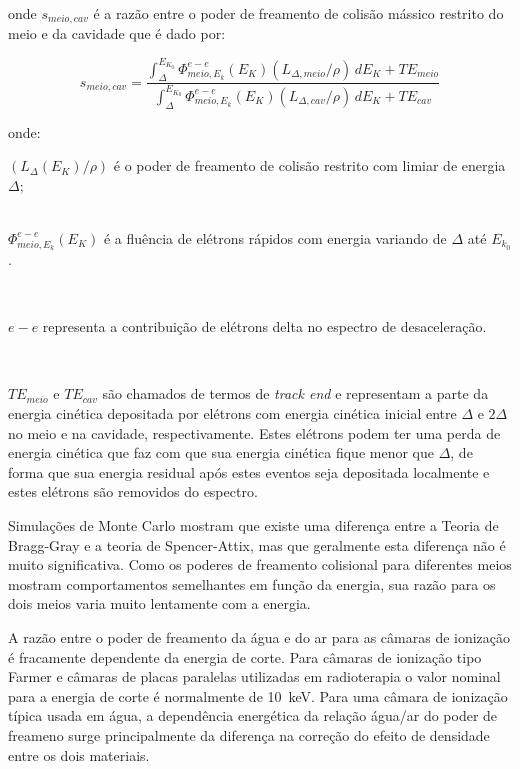 \documentclass[11pt,a4paper]{article}
\newcounter{exemplo}
\begin{document}
			\noindent onde $s_{meio,cav}$ é a razão entre o poder de freamento de colisão mássico restrito do meio e da cavidade que é dado por:

			
			\begin{equation}
				s_{meio,cav}
				= \frac{\int_{\Delta}^{E_{K_0}} \Phi_{meio, E_k}^{e-e}(E_K)(L_{\Delta , meio}/\rho)\,dE_K + TE_{meio}}
				{\int_{\Delta}^{E_{K_0}} \Phi_{meio, E_k}^{e-e}(E_K)(L_{\Delta , cav}/\rho)\,dE_K + TE_{cav}}
			\end{equation}

			\noindent onde:

			\begin{exemplo}
				
			
			\begin{flushleft}
				$(L_{\Delta}(E_K)/\rho)$ é o poder de freamento de colisão restrito com limiar de energia $\Delta$; \\

				\

				$\Phi_{meio, E_k}^{e-e}(E_K)$ é a fluência de elétrons rápidos com energia variando de $\Delta$ até $E_{k_0}$.

				\

				$e-e$ representa a contribuição de elétrons delta no espectro de desaceleração.

				\

				$TE_{meio}$ e $TE_{cav}$ são chamados de termos de \textit{track end} e representam a parte da energia cinética depositada por elétrons com energia cinética inicial entre $\Delta$ e $2\Delta$ no meio e na cavidade, respectivamente. Estes elétrons podem ter uma perda de energia cinética que faz com que sua energia cinética fique menor que $\Delta$, de forma que sua energia residual após estes eventos seja depositada localmente e estes elétrons são removidos do espectro. 

			\end{flushleft}
			\end{exemplo}

			Simulações de Monte Carlo mostram que existe uma diferença entre a Teoria de Bragg-Gray e a teoria de Spencer-Attix, mas que geralmente esta diferença não é muito significativa. Como os poderes de freamento colisional para diferentes meios mostram comportamentos semelhantes em função da energia, sua razão para os dois meios varia muito lentamente com a energia. 

			A razão entre o poder de freamento da água e do ar para as câmaras de ionização é fracamente dependente da energia de corte. Para câmaras de ionização tipo Farmer e câmaras de placas paralelas utilizadas em radioterapia o valor nominal para a energia de corte é normalmente de \qty{10}{keV}. Para uma câmara de ionização típica usada em água, a dependência energética da relação água/ar do poder de freameno surge principalmente da diferença na correção do efeito de densidade entre os dois materiais.
\end{document}
